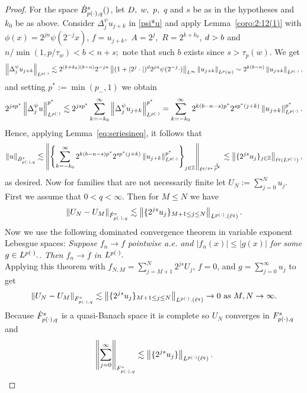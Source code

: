\begin{proof}
For the space $\besw{\pp}{s}{q}$, let $\A,$ $w,$ $p,$ $q$ and $s$ be as in the hypotheses and $k_0$ be as above. 
Consider $\Delta^\psi_j  u_{j+k}$  in  \eqref{psi*u} and  apply  Lemma~\ref{coro:2:12(1)}  with $\phi(x)=2^{jn}\psi(2^{-j} x)$, $f= u_{j+k},$ $A=2^{j},$ $R=2^{k +  k_0}$,  $\ex>b$ and $  n /\min(1,p/\tau_w)<b<n+s;$ note that such $b$ exists since $s>\tau_p(w).$ We get
\begin{align*}
 \norm{\Delta^\psi_j  u_{j+k}}{\Lp}  \lesssim 2^{(k + k_0)(b-n)} 2^{- j  n} \norm{(1 + |2^j \cdot|)^\ex 2^{jn}\psi(2^{-j}\cdot)}{L^\infty} \norm{u_{j+k}}{L^p(w)}\sim 2^{k(b-n)}   \norm{u_{j+k}}{\Lp},
\end{align*}
and setting $p^*:=\min(p_-,1)$ we obtain
\begin{align*}
2^{js p^*}\norm{\Delta^\psi_j  u}{\Lp}^{p^*} \lesssim 2^{js p^*}\sum_{k = - k_0}^\infty \norm{\Delta^\psi_j  u_{j+k}}{\Lp}^{p^*}
 =  \sum_{k = - k_0}^\infty 2^{k(b-n -s) p^*} 2^{s p^* (j+k)}   \norm{u_{j+k}}{\Lp}^{p^*}.
\end{align*}
Hence, applying Lemma~\ref{eq:seriesineq}, it follows that
\[
\norm{u}{\bes{\pp}{s}{q}}  
\lesssim  
\norm{\left\{ \sum_{k = - k_0}^\infty 2^{k(b-n -s) p^*}  2^{s p^* (j+k)}   \norm{u_{j+k}}{\Lp}^{p^*}\right\}_{j\in\ent}}{{\ell^{q/p*}}^\frac{1}{p^*}}
\lesssim  
\norm{\{2^{js} u_j\}_{j\in\ent}}{\ell^{q}(\Lp)}, 
\]
as desired.
Now for families that are not necessarily finite let $U_N := \sum_{j=0}^N u_j$. First we assume that $0<q<\infty$. Then for $M\leq N$ we have
\begin{equation}
\norm{U_N -U_M}{\tl{\pp}{s}{q}} \lesssim \norm{\{2^{js} u_j\}_{M+1\leq j \leq N}}{\Lp.(\ell^q)}.
\end{equation}
Now we use the following dominated convergence theorem in variable exponent Lebesgue spaces: 
\textit{Suppose $f_n \rightarrow f$ pointwise a.e. and $|f_n (x)| \leq |g(x)|$ for some $g\in \Lp.$. Then $f_n \rightarrow f$ in $\Lp.$}
\\
\medskip
Applying this theorem with $f_{N,M} = \sum_{j=M+1}^N 2^{js}U_j$, $f = 0$, and $g = \sum_{j=0}^\infty u_j$ to get 
\begin{equation}
\norm{U_N -U_M}{\itl{\pp}{s}{q}} \lesssim \norm{\{2^{js} u_j\}_{M+1\leq j \leq N}}{\Lp.(\ell^q)} \rightarrow 0 \text{ as } M,N \rightarrow \infty.
\end{equation}
Because $\tl{\pp}{s}{q}$ is a quasi-Banach space it is complete so $U_N$ converges in $\itl{\pp}{s}{q}$ and 
\begin{equation}
\norm{\sum_{j=0}^\infty}{\itl{\pp}{s}{q}} \lesssim \norm{\{2^{js} u_j\}}{\Lp(\ell^q)}.
\end{equation}


\end{proof}
